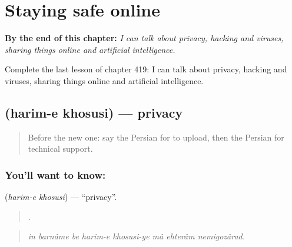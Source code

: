 
\chapter{Staying safe online}
\label{ch:fa-staying-safe-online}

\begin{chapteropening}
\textbf{By the end of this chapter:} \emph{I can talk about privacy, hacking and viruses, sharing things online and artificial intelligence.}

Complete the last lesson of chapter 419: I can talk about privacy, hacking and viruses, sharing things online and artificial intelligence.
\end{chapteropening}

\section[\texorpdfstring{\fa{حریم} \fa{خصوصی} (harim-e khosusi)}{حریم خصوصی (harim-e khosusi)}]{  (harim-e khosusi) — privacy}

\label{lesson:FA-C419-harim-e-khosusi}



\begin{quote}
Before the new one: say the Persian for to upload, then the Persian for technical support.
\end{quote}

\subsection*{You'll want to know:  }
\textbf{ } (\emph{harim-e khosusi}) — \textquotedblleft{}privacy\textquotedblright{}.

\begin{quote}
       .
\end{quote}

\begin{quote}
\emph{in barnâme be harim-e khosusi-ye mâ ehterâm nemigozârad.}
\end{quote}

